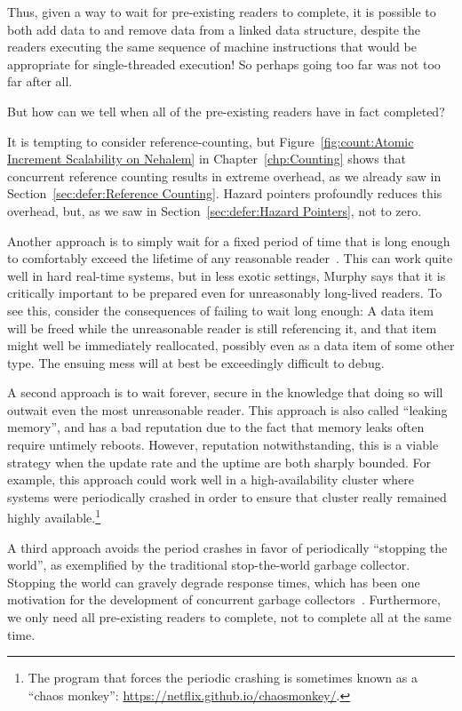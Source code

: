 Thus, given a way to wait for pre-existing readers to complete,
it is possible to both add data to and remove data from a linked
data structure, despite the readers executing the same sequence
of machine instructions that would be appropriate for single-threaded
execution!
So perhaps going too far was not too far after all.

But how can we tell when all of the pre-existing readers have in
fact completed?

It is tempting to consider reference-counting, but
Figure~\ref{fig:count:Atomic Increment Scalability on Nehalem}
in
Chapter~\ref{chp:Counting}
shows that concurrent reference counting results in extreme overhead,
as we already saw in
Section~\ref{sec:defer:Reference Counting}.
Hazard pointers profoundly reduces this overhead, but, as we saw in
Section~\ref{sec:defer:Hazard Pointers}, not to zero.

Another approach is to simply wait for a fixed period of time that is
long enough to comfortably exceed the lifetime of any reasonable
reader~\cite{Jacobson93,AjuJohn95}.
This can work quite well in hard real-time systems, but in less exotic
settings, Murphy says that it is critically important to be prepared
even for unreasonably long-lived readers.
To see this, consider the consequences of failing to wait long enough:
A data item will be freed while the unreasonable reader is still
referencing it, and that item might well be immediately reallocated,
possibly even as a data item of some other type.
The ensuing mess will at best be exceedingly difficult to debug.

A second approach is to wait forever, secure in the knowledge that
doing so will outwait even the most unreasonable reader.
This approach is also called ``leaking memory'', and has a bad reputation
due to the fact that memory leaks often require untimely reboots.
However, reputation notwithstanding, this is a viable strategy when
the update rate and the uptime are both sharply bounded.
For example, this approach could work well in a high-availability
cluster where systems were periodically crashed in order to ensure
that cluster really remained highly available.\footnote{
	The program that forces the periodic crashing is sometimes
	known as a ``chaos monkey'':
	\url{https://netflix.github.io/chaosmonkey/}.}

A third approach avoids the period crashes in favor of periodically
``stopping the world'', as exemplified by the traditional stop-the-world
garbage collector.
Stopping the world can gravely degrade response times, which has been
one motivation for the development of concurrent garbage
collectors~\cite{DavidFBacon2003RTGC}.
Furthermore, we only need all pre-existing readers to complete, not to
complete all at the same time.

